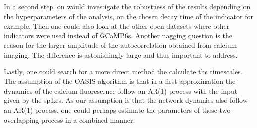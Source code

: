 \documentclass[12pt,a4paper,headinclude]{scrartcl}
\begin{document}
In a second step, on would investigate the robustness of the results depending on the hyperparameters of the analysis, on the chosen decay time of the indicator for example. 
Then one could also look at the other open datasets where other indicators were used instead of GCaMP6s. Another nagging question is the reason for the larger amplitude of the autocorrelation obtained from calcium imaging. The difference is astonishingly large and thus important to address.

Lastly, one could search for a more direct method the calculate the timescales. The assumption of the OASIS algorithm is that in a first approximation the dynamics of the calcium fluorescence follow an AR(1) process with the input given by the spikes. As our assumption is that the network dynamics also follow an AR(1) process, one could perhaps estimate the parameters of these two overlapping process in a combined manner. 

\printbibliography
\end{document}
